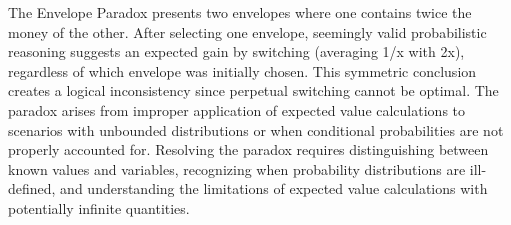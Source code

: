 The Envelope Paradox presents two envelopes where one contains twice the money of the other. After selecting one envelope, seemingly valid probabilistic reasoning suggests an expected gain by switching (averaging 1/x with 2x), regardless of which envelope was initially chosen. This symmetric conclusion creates a logical inconsistency since perpetual switching cannot be optimal. The paradox arises from improper application of expected value calculations to scenarios with unbounded distributions or when conditional probabilities are not properly accounted for. Resolving the paradox requires distinguishing between known values and variables, recognizing when probability distributions are ill-defined, and understanding the limitations of expected value calculations with potentially infinite quantities.
